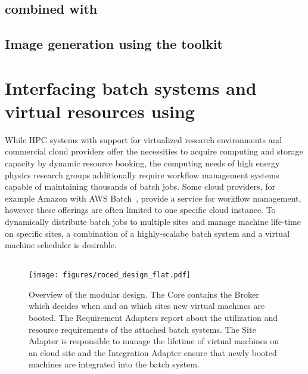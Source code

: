 \subsection{\Packer combined with \Puppet}





\subsection{Image generation using the \OZ toolkit}





\section{Interfacing batch systems and virtual resources using \Roced}
\label{section:roced}
While HPC systems with support for virtualized research environments and commercial cloud providers offer the
necessities to acquire computing and storage capacity by dynamic
resource booking, the computing needs of high energy physics
re\-search groups ad\-di\-tion\-al\-ly require work\-flow
ma\-na\-ge\-ment sys\-tems capable of maintaining thousands of batch
jobs. Some cloud providers, for example Amazon with AWS
Batch~\cite{awsbatch}, provide a service for workflow management,
however these offerings are often limited to one specific cloud instance. To dynamically distribute batch jobs to multiple sites and manage machine life-time on specific sites, a combination of a highly-scalabe batch system and a virtual machine scheduler is desirable.

\subsection{\Roced}
\begin{figure}
\begin{center}
  \texttt{[image: figures/roced\_design\_flat.pdf]}
  \caption{Overview of the \Roced modular design. The  \Roced Core contains the Broker which decides when and on which sites new virtual machines are booted. The Requirement Adapters report about the utilization and resource requirements of the attached batch systems. The Site Adapter is responsible to manage the lifetime of virtual machines on an cloud site and the Integration Adapter ensure that newly booted machines are integrated into the batch system.}
  \label{fig-roced}
\end{center}
\end{figure}

